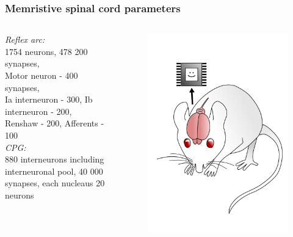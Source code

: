 \documentclass[12pt, aspectratio=169]{beamer}
\begin{document}
\begin{frame}
  \frametitle{Memristive spinal cord parameters}
\begin{columns}[c]

\emph{Reflex arc:}\\
1754 neurons, 478 200 synapses,\\
Motor neuron - 400 synapses,\\
Ia interneuron - 300,
Ib interneuron - 200,\\
Renshaw - 200,
Afferents - 100\\


\emph{CPG:}\\
880 interneurons including interneuronal pool,
40 000 synapses,
each nucleaus 20 neurons

\begin{figure}
\includegraphics[width=1.0\linewidth]{mousebrainpink}
\end{figure}
\end{columns}
\end{frame}

\end{document}
